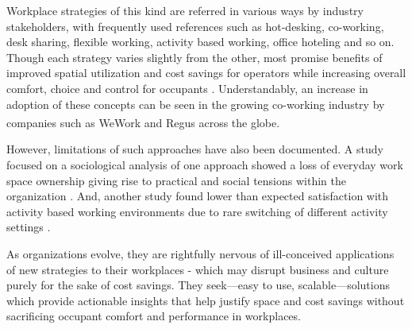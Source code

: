 \documentclass[]{interact}
\theoremstyle{plain}%
\theoremstyle{definition}
\theoremstyle{remark}
\begin{document}

Workplace strategies of this kind are referred in various ways by industry stakeholders, with frequently used references such as hot-desking, co-working, desk sharing, flexible working, activity based working, office hoteling and so on. Though each strategy varies slightly from the other, most promise benefits of improved spatial utilization and cost savings for operators while increasing overall comfort, choice and control for occupants \citep{Engelen2018IsReview}. Understandably, an increase in adoption of these concepts can be seen in the growing co-working industry by companies such as WeWork\textsuperscript{\textregistered} and Regus\textsuperscript{\textregistered} across the globe.  %

However, limitations of such approaches have also been documented. A study focused on a sociological analysis of one approach showed a loss of everyday work space ownership giving rise to practical and social tensions within the organization \cite{Hirst2011SettlersHot-desking}. And, another study found lower than expected satisfaction with activity based working environments due to rare switching of different activity settings \citep{Hoendervanger2016FlexibilityEnvironments}. 


As organizations evolve, they are rightfully nervous of ill-conceived applications of new strategies to their workplaces - which may disrupt business and culture purely for the sake of cost savings. They seek---easy to use, scalable---solutions which provide actionable insights that help justify space and cost savings without sacrificing occupant comfort and performance in workplaces. 
\end{document}
